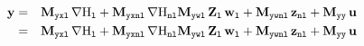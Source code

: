 \documentclass[10pt,a4paper]{article}
\begin{document}
\begin{eqnarray}
\vy & = &\M{yxl}\,\nabla \Hl + \M{yxnl}\,\nabla \Hnl\M{ywl}\,\mat Z_{\lab l}\,\vwl + \M{ywnl}\,\vznl + \M{yy}\,\vu\\
&=& \M{yxl}\,\nabla \Hl + \M{yxnl}\,\nabla \Hnl\M{ywl}\,\mat Z_{\lab l}\,\vwl + \M{ywnl}\,\vznl + \M{yy}\,\vu\\
\end{eqnarray}



\end{document}
